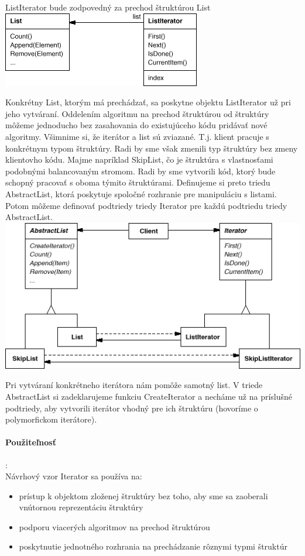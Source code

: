			ListIterator bude zodpovedný za prechod štruktúrou List\\
				\includegraphics[width=.7\textwidth]{images/iterator1}

			Konkrétny List, ktorým má prechádzať, sa poskytne objektu ListIterator už pri jeho vytváraní. Oddelením algoritmu na prechod štruktúrou od štruktúry môžeme jednoducho bez zasahovania do existujúceho kódu pridávať nové algoritmy. Všimnime si, že iterátor a list sú zviazané. T.j. klient pracuje s konkrétnym typom štruktúry. Radi by sme však zmenili typ štruktúry bez zmeny klientovho kódu. Majme napríklad SkipList, čo je štruktúra s vlastnosťami podobnými balancovaným stromom. Radi by sme vytvorili kód, ktorý bude schopný pracovať s oboma týmito štruktúrami. Definujeme si preto triedu AbstractList, ktorá poskytuje spoločné rozhranie pre manipuláciu s listami. Potom môžeme definovať podtriedy triedy Iterator pre každú podtriedu triedy AbstractList.\\

				\includegraphics[width=.9\textwidth]{images/iterator2}

			Pri vytváraní konkrétneho iterátora nám pomôže samotný list. V triede AbstractList si zadeklarujeme funkciu CreateIterator a necháme už na príslušné podtriedy, aby vytvorili iterátor vhodný pre ich štruktúru (hovoríme o polymorfickom iterátore).

			\paragraph{Použiteľnosť}:\\
			Návrhový vzor Iterator sa používa na:
				\begin{itemize}
					\item prístup k objektom zloženej štruktúry bez toho, aby sme sa zaoberali vnútornou reprezentáciu štruktúry
					\item podporu viacerých algoritmov na prechod štruktúrou
					\item poskytnutie jednotného rozhrania na prechádzanie rôznymi typmi štruktúr
				\end{itemize}
